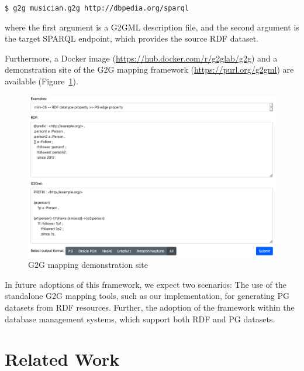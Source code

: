 \documentclass[runningheads]{llncs}
\begin{document}
\texttt{\$ g2g musician.g2g http://dbpedia.org/sparql}

\noindent where the first argument is a G2GML description file, and the second argument is the target SPARQL endpoint, which provides the source RDF dataset.

Furthermore, a Docker image (\url{https://hub.docker.com/r/g2glab/g2g}) and a demonstration site of the G2G mapping framework (\url{https://purl.org/g2gml}) are available (Figure~\ref{fig:sandbox}).

\begin{figure}
\center
\includegraphics[width=1.0\textwidth]{sandbox.png}
\caption{G2G mapping demonstration site}
\label{fig:sandbox}
\end{figure}

In future adoptions of this framework, we expect two scenarios: The use of the standalone G2G mapping tools, such as our implementation, for generating PG datasets from RDF resources. Further, the adoption of the framework within the database management systems, which support both RDF and PG datasets.

\section{Related Work}
\end{document}
